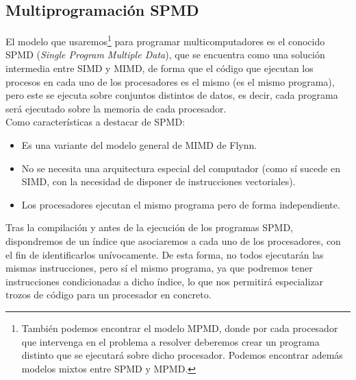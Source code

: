 \subsection{Multiprogramación SPMD}
El modelo que usaremos\footnote{También podemos encontrar el modelo MPMD, donde por cada procesador que intervenga en el problema a resolver deberemos crear un programa distinto que se ejecutará sobre dicho procesador. Podemos encontrar además modelos mixtos entre SPMD y MPMD\@.} para programar multicomputadores es el conocido SPMD (\textit{Single Program Multiple Data}), que se encuentra como una solución intermedia entre SIMD y MIMD, de forma que el código que ejecutan los procesos en cada uno de los procesadores es el mismo (es el mismo programa), pero este se ejecuta sobre conjuntos distintos de datos, es decir, cada programa será ejecutado sobre la memoria de cada procesador.\\

Como características a destacar de SPMD:
\begin{itemize}
    \item Es una variante del modelo general de MIMD de Flynn.
    \item No se necesita una arquitectura especial del computador (como sí sucede en SIMD, con la necesidad de disponer de instrucciones vectoriales).
    \item Los procesadores ejecutan el mismo programa pero de forma independiente.
\end{itemize}

Tras la compilación y antes de la ejecución de los programas SPMD, dispondremos de un índice que asociaremos a cada uno de los procesadores, con el fin de identificarlos unívocamente. De esta forma, no todos ejecutarán las mismas instrucciones, pero sí el mismo programa, ya que podremos tener instrucciones condicionadas a dicho índice, lo que nos permitirá especializar trozos de código para un procesador en concreto.

